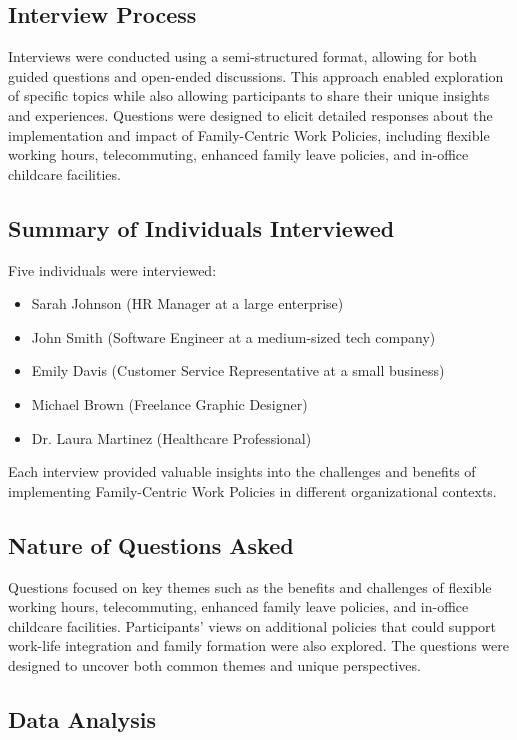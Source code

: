 \documentclass{article} %
\begin{document}
\subsection{Interview Process}

Interviews were conducted using a semi-structured format, allowing for both guided questions and open-ended discussions. This approach enabled exploration of specific topics while also allowing participants to share their unique insights and experiences. Questions were designed to elicit detailed responses about the implementation and impact of Family-Centric Work Policies, including flexible working hours, telecommuting, enhanced family leave policies, and in-office childcare facilities.

\subsection{Summary of Individuals Interviewed}

Five individuals were interviewed:
\begin{itemize}
    \item Sarah Johnson (HR Manager at a large enterprise)
    \item John Smith (Software Engineer at a medium-sized tech company)
    \item Emily Davis (Customer Service Representative at a small business)
    \item Michael Brown (Freelance Graphic Designer)
    \item Dr. Laura Martinez (Healthcare Professional)
\end{itemize}
Each interview provided valuable insights into the challenges and benefits of implementing Family-Centric Work Policies in different organizational contexts.

\subsection{Nature of Questions Asked}

Questions focused on key themes such as the benefits and challenges of flexible working hours, telecommuting, enhanced family leave policies, and in-office childcare facilities. Participants' views on additional policies that could support work-life integration and family formation were also explored. The questions were designed to uncover both common themes and unique perspectives.

\subsection{Data Analysis}
\end{document}
